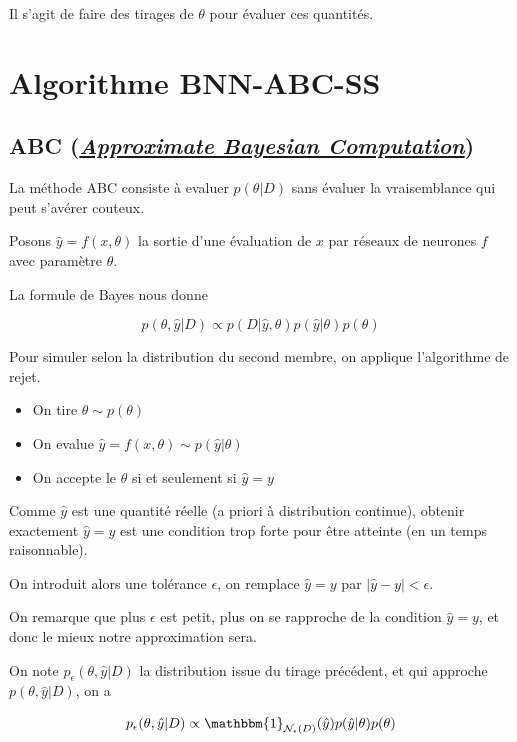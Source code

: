 \documentclass[french,12pt]{article}
\begin{document}
Il s'agit de faire des tirages de $\theta$ pour évaluer ces quantités.

\pagebreak

\section{Algorithme BNN-ABC-SS}

\subsection{ABC (\href{https://en.wikipedia.org/wiki/Approximate_Bayesian_computation}{\textit{Approximate Bayesian Computation}})}

La méthode ABC consiste à evaluer $p(\theta | D)$ sans évaluer
la vraisemblance qui peut s'avérer couteux.

Posons $\hat{y} = f(x, \theta)$ la sortie d'une évaluation de $x$ par
réseaux de neurones $f$ avec paramètre $\theta$.

La formule de Bayes nous donne

$$ p(\theta, \hat{y} | D) \propto p(D | \hat{y}, \theta) p(\hat{y} | \theta)
    p(\theta)$$

Pour simuler selon la distribution du second membre, on applique
l'algorithme de rejet.

\begin{itemize}
    \item On tire $\theta \sim p(\theta)$
    \item On evalue $\hat{y} = f(x , \theta) \sim p(\hat{y} | \theta)$
    \item On accepte le $\theta$ si et seulement si $\hat{y} = y$
\end{itemize}

Comme $\hat{y}$ est une quantité réelle (a priori à distribution continue),
obtenir exactement $\hat{y} = y$ est une condition trop forte
pour être atteinte (en un temps raisonnable).

On introduit alors une tolérance $\epsilon$, on remplace $\hat{y} = y$
par $|\hat{y} - y| < \epsilon$.

On remarque que plus $\epsilon$ est petit, plus on se rapproche de la condition $\hat{y} = y$,
et donc le mieux notre approximation sera.

On note $p_{\epsilon} (\theta, \hat{y} | D)$ la distribution issue
du tirage précédent, et qui approche $p(\theta, \hat{y} |D)$, on a

$$p_{\epsilon} (\theta , \hat{y} | D) \propto \mathbbm{1}_{\mathcal{N}_{\epsilon}(D)} (\hat{y}) p(\hat{y} | \theta)
    p(\theta) $$
\end{document}
